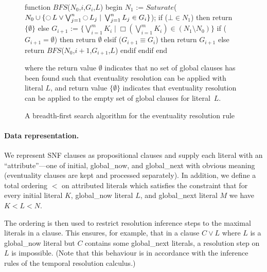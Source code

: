 \documentclass[11pt]{article}
\newcommand{\predset}[2]{\{#1\;|\;#2\}}
\newcommand{\Next}[0]{\mathop{\ocircle}}
\newcommand{\Always}[0]{\mathop{\Box}}
\newcommand{\initial}{\textsf{initial}}
\newcommand{\globalnow}{\textsf{global\_now}}
\newcommand{\globalnext}{\textsf{global\_next}}
\begin{document}
\begin{figure}[htb]
\begin{program}\UnnumLine
\InBodyLeftNumberLine
function $\mathit{BFS}$($N_0$,$i$,$G_i$,$L$)\UnnumLine
begin\UnnumLine
  $N_1$ := $\mathit{Saturate}$($N_0\cup\predset{\Next{L}\lor\bigvee_{j=1}^n\Next{L_j}}{\bigvee_{j=1}^n{L_j}\in G_i}$);\UnnumLine
  if ($\bot\in{N_1}$) then\UnnumLine
     return $\{\emptyset\}$\UnnumLine
  else\UnnumLine
     $G_{i+1}$ := $\predset{\bigvee_{i=1}^m{K_i}}{\Always(\bigvee_{i=1}^m{K_i})\in({N_1}\setminus{N_0})}$\UnnumLine
     if ($G_{i+1}=\emptyset$) then\UnnumLine
        return $\emptyset$\UnnumLine
     elsif ($G_{i+1}\equiv{G_i}$) then\UnnumLine
        return $G_{i+1}$\UnnumLine
     else\UnnumLine
        return $\mathit{BFS}$($N_0$,$i+1$,$G_{i+1}$,$L$)\UnnumLine
     endif\UnnumLine
  endif\UnnumLine
end
\end{program}
where the return value $\emptyset$ indicates that no set of global
clauses has been found such that eventuality resolution can be applied
with literal $L$, and return value $\{\emptyset\}$ indicates that
eventuality resolution can be applied to the empty set of global
clauses for literal~$L$.
\caption{A breadth-first search algorithm for the eventuality
  resolution rule\label{prog_bfs}}
\end{figure}

\paragraph{Data representation.}
We represent SNF clauses as propositional clauses and supply each literal
with an ``attribute''---one of \initial{}, \globalnow{}, and \globalnext{}
with obvious meaning (eventuality clauses are kept and processed
separately). In addition, we define a total ordering $<$ on attributed
literals which satisfies the constraint that for every \initial{}
literal $K$, \globalnow{} literal $L$, and \globalnext{} 
literal $M$  we have $K<L<N$. 

The ordering is then used to restrict resolution inference steps to
the maximal literals in a clause. This ensures, for example, that
in a clause $C\lor L$ where $L$ is a \globalnow{} literal but $C$
contains some \globalnext{} literals, a resolution step on $L$ is
impossible. (Note that this behaviour is in accordance with the
inference rules of the temporal resolution calculus.) 
\end{document}

